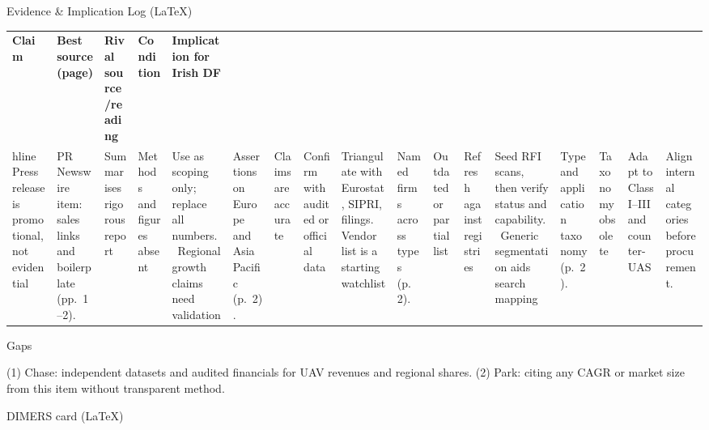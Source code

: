 Evidence & Implication Log (LaTeX)

\usepackage{array}
\begin{tabular}{p{3.2cm}p{4.2cm}p{3.6cm}p{3.2cm}p{4.2cm}}
	\textbf{Claim} & \textbf{Best source (page)} & \textbf{Rival source/reading} & \textbf{Condition} & \textbf{Implication for Irish DF}\\hline
	Press release is promotional, not evidential & PR Newswire item: sales links and boilerplate (pp.~1–2). & Summarises rigorous report & Methods and figures absent & Use as scoping only; replace all numbers.\
	Regional growth claims need validation & Assertions on Europe and Asia Pacific (p.~2). & Claims are accurate & Confirm with audited or official data & Triangulate with Eurostat, SIPRI, filings.\
	Vendor list is a starting watchlist & Named firms across types (p.~2). & Outdated or partial list & Refresh against registries & Seed RFI scans, then verify status and capability.\
	Generic segmentation aids search mapping & Type and application taxonomy (p.~2). & Taxonomy obsolete & Adapt to Class I–III and counter-UAS & Align internal categories before procurement.\
\end{tabular}

Gaps

(1) Chase: independent datasets and audited financials for UAV revenues and regional shares.
(2) Park: citing any CAGR or market size from this item without transparent method.

\parencite{YIN_2020}
DIMERS card (LaTeX)

